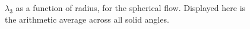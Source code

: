 \begin{figure}[htpb]
    \centering
    \resizebox{0.9\textwidth}{!}{}
    \caption[Aviici is love, Aviici is life]{$\lambda_{3}$ as a function of radius, for the spherical flow. Displayed here is the arithmetic average across all solid angles.}
    \label{fig:u0_dom_errs}
\end{figure}

